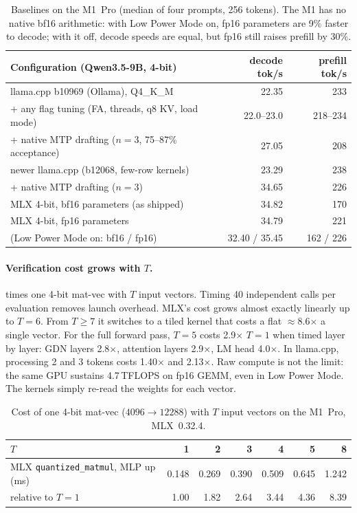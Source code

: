 \documentclass[11pt]{article}
\begin{document}
\begin{table}[t]\centering\small
\begin{tabular}{lrr}\toprule
Configuration (Qwen3.5-9B, 4-bit) & decode tok/s & prefill tok/s\\\midrule
llama.cpp b10969 (Ollama), Q4\_K\_M & 22.35 & 233\\
\quad + any flag tuning (FA, threads, q8 KV, load mode) & 22.0--23.0 & 218--234\\
\quad + native MTP drafting ($n{=}3$, 75--87\% acceptance) & 27.05 & 208\\
\quad newer llama.cpp (b12068, few-row kernels) & 23.29 & 238\\
\qquad + native MTP drafting ($n{=}3$) & 34.65 & 226\\
MLX 4-bit, bf16 parameters (as shipped) & 34.82 & 170\\
MLX 4-bit, fp16 parameters & 34.79 & 221\\
\quad (Low Power Mode on: bf16 / fp16) & 32.40 / 35.45 & 162 / 226\\\bottomrule
\end{tabular}
\caption{Baselines on the M1~Pro (median of four prompts, 256 tokens). The M1 has no native bf16 arithmetic: with Low Power Mode on, fp16 parameters are 9\% faster to decode; with it off, decode speeds are equal, but fp16 still raises prefill by 30\%.}
\label{tab:baselines}
\end{table}

\paragraph{Verification cost grows with $T$.}  times one 4-bit mat-vec with $T$ input vectors. Timing 40 independent calls per evaluation removes launch overhead. MLX's cost grows almost exactly linearly up to $T{=}6$. From $T{\ge}7$ it switches to a tiled kernel that costs a flat $\approx$8.6$\times$ a single vector. For the full forward pass, $T{=}5$ costs 2.9$\times$ $T{=}1$ when timed layer by layer: GDN layers 2.8$\times$, attention layers 2.9$\times$, LM head 4.0$\times$. In llama.cpp, processing 2 and 3 tokens costs 1.40$\times$ and 2.13$\times$. Raw compute is not the limit: the same GPU sustains 4.7\,TFLOPS on fp16 GEMM, even in Low Power Mode. The kernels simply re-read the weights for each vector.

\begin{table}[t]\centering\small
\begin{tabular}{lrrrrrr}\toprule
$T$ & 1 & 2 & 3 & 4 & 5 & 8\\\midrule
MLX \texttt{quantized\_matmul}, MLP up (ms) & 0.148 & 0.269 & 0.390 & 0.509 & 0.645 & 1.242\\
\quad relative to $T{=}1$ & 1.00 & 1.82 & 2.64 & 3.44 & 4.36 & 8.39\\\bottomrule
\end{tabular}
\caption{Cost of one 4-bit mat-vec ($4096\!\to\!12288$) with $T$ input vectors on the M1~Pro, MLX~0.32.4.}
\label{tab:tscale}
\end{table}
\end{document}
